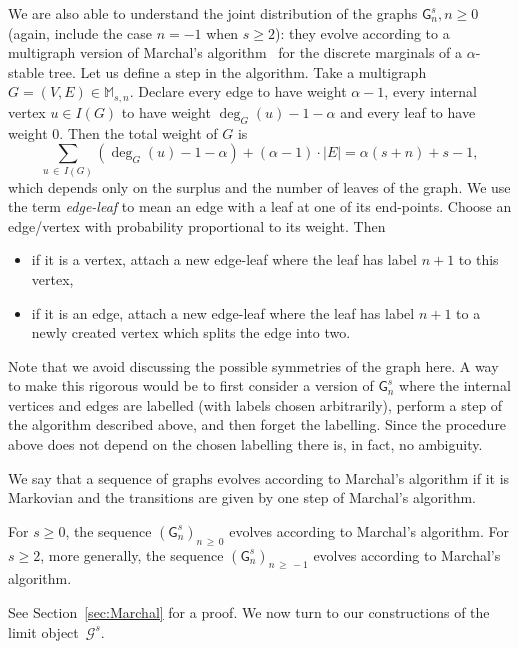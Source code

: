 \documentclass[AHL,Unicode,longabstracts,published]{cedram}
\newcommand{\cG}{\mathcal{G}}
\newcommand{\sG}{\mathsf{G}}
\newcommand{\M}{\mathbb{M}}
\begin{document}
We are also able to understand the joint distribution of the graphs $\sG_{n}^s,n\geq 0$ (again, include the case $n=-1$ when $s\geq 2$): they evolve according to a multigraph version of Marchal's algorithm~\cite{Marchal} for the discrete marginals of a $\alpha$-stable tree. Let us define a step in the algorithm. Take a multigraph $G=(V,E)\in \M_{s,n}$. Declare every edge to have weight $\alpha-1$, every internal vertex $u\in I(G)$ to have weight $\deg_G(u)-1-\alpha$ and every leaf to have weight 0. Then the total weight of $G$ is
\begin{equation}\label{identity:degrees}
\sum_{u\,\in\,I(G)}\left(\deg_G(u)-1-\alpha\right)+ (\alpha-1) \cdot |E|=\alpha(s+n)+s-1,
\end{equation}
which depends only on the surplus and the number of leaves of the graph. We use the term \emph{edge-leaf} to mean an edge with a leaf at one of its end-points. Choose an edge/vertex with probability proportional to its weight. Then
\begin{itemize}
\item if it is a vertex, attach a new edge-leaf where the leaf has label $n+1$ to this vertex,
\item if it is an edge, attach a new edge-leaf where the leaf has label $n+1$ to a newly created vertex which splits the edge into two.
\end{itemize}
Note that we avoid discussing the possible symmetries of the graph here. A way to make this rigorous would be to first consider a version of $\sG_{n}^s$ where the internal vertices and edges are labelled (with labels chosen arbitrarily), perform a step of the algorithm described above, and then forget the labelling. Since the procedure above does not depend on the chosen labelling there is, in fact, no ambiguity.

We say that a sequence of graphs evolves according to Marchal's algorithm if it is Markovian and the transitions are given by one step of Marchal's algorithm.

\begin{theo}\label{thm:MarchalAlg}
For $s \ge 0$, the sequence $(\sG_n^s)_{n\,\ge\,0}$ evolves according to Marchal's algorithm. For $s \geq 2$, more generally, the sequence $(\sG_n^s)_{n\,\ge\, -1}$ evolves according to Marchal's algorithm.
\end{theo}

See Section~\ref{sec:Marchal} for a proof. We now turn to our constructions of the limit object~$\cG^s$.
\end{document}

